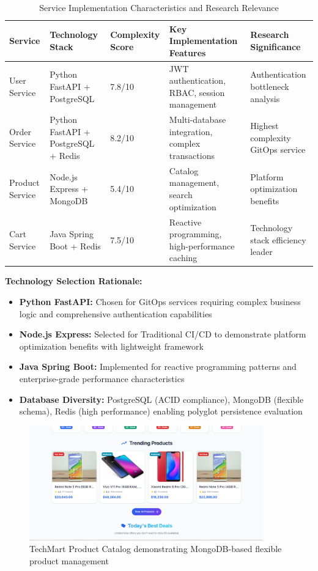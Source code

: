 \begin{table}[H]
\centering
\caption{Service Implementation Characteristics and Research Relevance}
\label{tab:service-implementation-comparison}
\begin{tabular}{|p{2.5cm}|p{3cm}|p{2cm}|p{3cm}|p{3.5cm}|}
\hline
\textbf{Service} & \textbf{Technology Stack} & \textbf{Complexity Score} & \textbf{Key Implementation Features} & \textbf{Research Significance} \\
\hline
User Service & Python FastAPI + PostgreSQL & 7.8/10 & JWT authentication, RBAC, session management & Authentication bottleneck analysis \\
\hline
Order Service & Python FastAPI + PostgreSQL + Redis & 8.2/10 & Multi-database integration, complex transactions & Highest complexity GitOps service \\
\hline
Product Service & Node.js Express + MongoDB & 5.4/10 & Catalog management, search optimization & Platform optimization benefits \\
\hline
Cart Service & Java Spring Boot + Redis & 7.5/10 & Reactive programming, high-performance caching & Technology stack efficiency leader \\
\hline
\end{tabular}
\end{table}

\textbf{Technology Selection Rationale:}
\begin{itemize}
\item \textbf{Python FastAPI:} Chosen for GitOps services requiring complex business logic and comprehensive authentication capabilities
\item \textbf{Node.js Express:} Selected for Traditional CI/CD to demonstrate platform optimization benefits with lightweight framework
\item \textbf{Java Spring Boot:} Implemented for reactive programming patterns and enterprise-grade performance characteristics
\item \textbf{Database Diversity:} PostgreSQL (ACID compliance), MongoDB (flexible schema), Redis (high performance) enabling polyglot persistence evaluation
\end{itemize}

\begin{figure}[H]
\centering
\includegraphics[width=0.9\textwidth]{figures/chapter5/techmart-products-catalog.png}
\caption{TechMart Product Catalog demonstrating MongoDB-based flexible product management}
\label{fig:techmart-products-catalog}
\end{figure}

